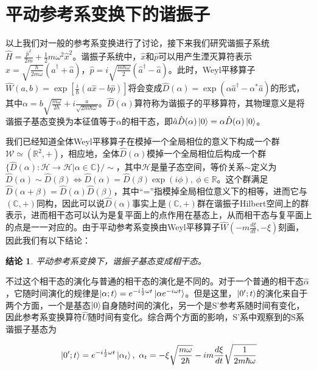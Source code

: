 \documentclass[a4paper]{article}
\newtheorem*{conclusion}{结论}
\begin{document}
    
    \section{平动参考系变换下的谐振子}

        以上我们对一般的参考系变换进行了讨论，接下来我们研究谐振子系统$\hat{H}=\frac{\hat{p}^2}{2m}+\frac{1}{2}m\omega^2\hat{x}^2$。谐振子系统中，$\hat{x}$和$\hat{p}$可以用产生湮灭算符表示$\hat{x}=\sqrt{\frac{\hbar}{2m\omega}}(\hat{a}^\dagger+\hat{a})$，$\hat{p}=i\sqrt{\frac{m\hbar\omega}{2}}(\hat{a}^\dagger-\hat{a})$。此时，Weyl平移算子$\hat{W}(a,b)=\exp[\frac{i}{\hbar}(a\hat{x}-b\hat{p})]$将会变成$\hat{D}(\alpha)=\exp(\alpha\hat{a}^\dagger-\alpha^*\hat{a})$的形式，其中$\alpha=b\sqrt{\frac{m\omega}{2\hbar}}+i\frac{a}{\sqrt{2m\hbar\omega}}$。$\hat{D}(\alpha)$算符称为谐振子的平移算符，其物理意义是将谐振子基态变换为本征值等于$\alpha$的相干态，即$\hat{a}\hat{D}(\alpha)\ket{0}=\alpha\hat{D}(\alpha)\ket{0}$。

        我们已经知道全体Weyl平移算子在模掉一个全局相位的意义下构成一个群$\mathcal{W}\simeq(\mathbb{R}^2,+)$，相应地，全体$\hat{D}(\alpha)$模掉一个全局相位后构成一个群$\{\hat{D}(\alpha):\mathcal{H}\to\mathcal{H}|\alpha\in\mathbb{C}\}/\sim$，其中$\mathcal{H}$是量子态空间，等价关系$\sim$定义为$\hat{D}(\alpha)\sim\hat{D}(\beta) \Leftrightarrow \hat{D}(\alpha)=\hat{D}(\beta)\exp(i\phi),\ \phi\in\mathbb{R}$。这个群满足$\hat{D}(\alpha+\beta)=\hat{D}(\alpha)\hat{D}(\beta)$，其中“=”指模掉全局相位意义下的相等，进而它与$(\mathbb{C},+)$同构，因此可以说$\hat{D}(\alpha)$事实上是$(\mathbb{C},+)$群在谐振子Hilbert空间上的群表示，进而相干态可以认为是复平面上的点作用在基态上，从而相干态与复平面上的点是一一对应的。由于平动参考系变换由Weyl平移算子$\hat{W}(-m\frac{d\xi}{dt}, -\xi)$刻画，因此我们有以下结论：

        \begin{conclusion}
            平动参考系变换下，谐振子基态变成相干态。
        \end{conclusion}

        不过这个相干态的演化与普通的相干态的演化是不同的。对于一个普通的相干态$\hat{\alpha}$，它随时间演化的规律是$\ket{\alpha;t}=e^{-i\frac{1}{2}\omega t}\ket{\alpha e^{-i\omega t}}$。但是这里，$\ket{0';t}$的演化来自于两个方面，一个是基态$\ket{0}$自身随时间的演化，另一个是S'参考系随时间有变化，因此参考系变换算符$\hat{U}$随时间有变化。综合两个方面的影响，S'系中观察到的S系谐振子基态为

        \begin{equation}
            \ket{0';t} = e^{-i\frac{1}{2}\omega t}\ket{\alpha_t}, \ \alpha_t=-\xi\sqrt{\frac{m\omega}{2\hbar}}-im\frac{d\xi}{dt}\sqrt{\frac{1}{2m\hbar\omega}}
        \end{equation}
\end{document}
